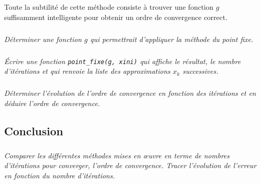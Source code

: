 \documentclass[10pt]{article}
\begin{document}
Toute la subtilité de cette méthode consiste à trouver une fonction $g$ suffisamment intelligente pour obtenir un ordre de convergence correct.

\subparagraph{}\textit{Déterminer une fonction $g$ qui permettrait d'appliquer la méthode du point fixe.}

\subparagraph{}\textit{Écrire une fonction \texttt{point\_fixe(g, xini)} qui affiche le résultat, le nombre d'itérations et qui renvoie la liste des approximations $x_k$ successives.}

\subparagraph{}\textit{Déterminer l'évolution de l'ordre de convergence en fonction des itérations et en déduire l'ordre de convergence.}

\subsection{Conclusion}
\subparagraph{}\textit{Comparer les différentes méthodes mises en \oe uvre en terme de nombres d'itérations pour converger, l'ordre de convergence. Tracer l'évolution de l'erreur en fonction du nombre d'itérations.}
\end{document}
